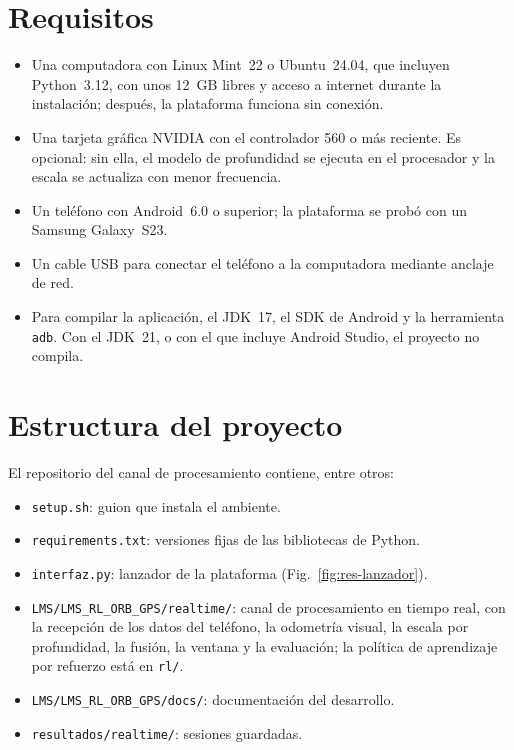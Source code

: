 \section{Requisitos}

\begin{itemize}
\item Una computadora con Linux Mint~22 o Ubuntu~24.04, que incluyen Python~3.12, con unos 12~GB libres y acceso a internet durante la instalación; después, la plataforma funciona sin conexión.
\item Una tarjeta gráfica NVIDIA con el controlador 560 o más reciente. Es opcional: sin ella, el modelo de profundidad se ejecuta en el procesador y la escala se actualiza con menor frecuencia.
\item Un teléfono con Android~6.0 o superior; la plataforma se probó con un Samsung Galaxy~S23.
\item Un cable USB para conectar el teléfono a la computadora mediante anclaje de red.
\item Para compilar la aplicación, el JDK~17, el SDK de Android y la herramienta \texttt{adb}. Con el JDK~21, o con el que incluye Android Studio, el proyecto no compila.
\end{itemize}

\section{Estructura del proyecto}

El repositorio del canal de procesamiento contiene, entre otros:

\begin{itemize}
\item \texttt{setup.sh}: guion que instala el ambiente.
\item \texttt{requirements.txt}: versiones fijas de las bibliotecas de Python.
\item \texttt{interfaz.py}: lanzador de la plataforma (Fig.~\ref{fig:res-lanzador}).
\item \texttt{LMS/LMS\_RL\_ORB\_GPS/realtime/}: canal de procesamiento en tiempo real, con la recepción de los datos del teléfono, la odometría visual, la escala por profundidad, la fusión, la ventana y la evaluación; la política de aprendizaje por refuerzo está en \texttt{rl/}.
\item \texttt{LMS/LMS\_RL\_ORB\_GPS/docs/}: documentación del desarrollo.
\item \texttt{resultados/realtime/}: sesiones guardadas.
\end{itemize}

